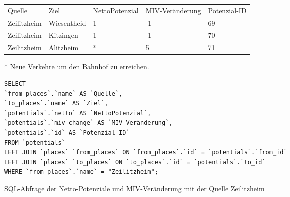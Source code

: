 \begin{tabularx}{\textwidth}{*5{X}}
Quelle & Ziel & NettoPotenzial & MIV-Veränderung & Potenzial-ID\\ 
Zeilitzheim & Wiesentheid & 1 & -1 & 69\\ 
Zeilitzheim & Kitzingen & 1 & -1 & 70\\ 
Zeilitzheim & Alitzheim & * & 5 & 71\\ 
\end{tabularx}    
\newline
\newline
* Neue Verkehre um den Bahnhof zu erreichen.
\newline
\begin{listing}[htbp]
\begin{verbatim}
SELECT
`from_places`.`name` AS `Quelle`, 
`to_places`.`name` AS `Ziel`, 
`potentials`.`netto` AS `NettoPotenzial`, 
`potentials`.`miv-change` AS `MIV-Veränderung`, 
`potentials`.`id` AS `Potenzial-ID`
FROM `potentials`
LEFT JOIN `places` `from_places` ON `from_places`.`id` = `potentials`.`from_id`
LEFT JOIN `places` `to_places` ON `to_places`.`id` = `potentials`.`to_id`
WHERE `from_places`.`name` = "Zeilitzheim";
\end{verbatim}
\caption{SQL-Abfrage der Netto-Potenziale und MIV-Veränderung mit der Quelle Zeilitzheim}\label{lst-fz-zeilitzheim}
\end{listing}